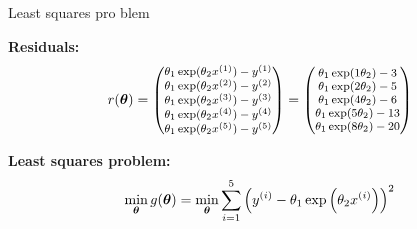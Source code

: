 \documentclass[11pt,compress,t,notes=noshow, xcolor=table]{beamer}
\begin{document}
\begin{vbframe}{Least squares pro blem}

\textbf{Residuals:}
\begin{equation*}
    \footnotesize
    r(\bm{\theta}) = \begin{pmatrix} 
        \theta_1 \exp(\theta_2 x^{(1)}) - y^{(1)} \\
        \theta_1 \exp(\theta_2 x^{(2)}) - y^{(2)} \\
        \theta_1 \exp(\theta_2 x^{(3)}) - y^{(3)} \\
        \theta_1 \exp(\theta_2 x^{(4)}) - y^{(4)} \\
        \theta_1 \exp(\theta_2 x^{(5)}) - y^{(5)}
     \end{pmatrix} = \begin{pmatrix} 
        \theta_1 \exp(1 \theta_2) - 3 \\
        \theta_1 \exp(2 \theta_2) - 5 \\
        \theta_1 \exp(4 \theta_2) - 6 \\
        \theta_1 \exp(5 \theta_2) - 13 \\
        \theta_1 \exp(8 \theta_2) - 20
     \end{pmatrix}
\end{equation*}

\textbf{Least squares problem:}
\begin{equation*}
    \min_{\bm{\theta}} g(\bm{\theta}) = \min_{\bm{\theta}} \sum_{i=1}^{5} \left(y^{(i)} - \theta_1 \exp\left(\theta_2 x^{(i)}\right)\right)^2
\end{equation*}

\end{vbframe}
\end{document}
